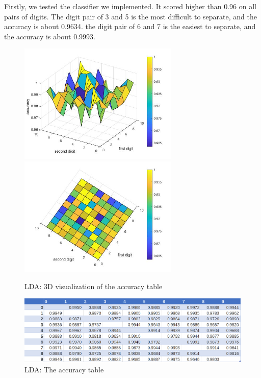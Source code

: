 \documentclass{article}
\begin{document}
Firstly, we tested the classifier we implemented. It scored higher than 0.96 on all pairs of digits. The digit pair of 3 and 5 is the most difficult to separate, and the accuracy is about 0.9634. the digit pair of 6 and 7 is the easiest to separate, and the accuracy is about 0.9993.\\
\begin{figure}[h]
    \centerline{\includegraphics[width=3in]{surf1.jpg}\includegraphics[width=3in]{surf2.jpg}}
    \caption{LDA: 3D visualization of the accuracy table}
\end{figure}
\begin{figure}[h]
    \centerline{\includegraphics[width=6in]{LDAtable.PNG}}
    \caption{LDA: The accuracy table}
\end{figure}
\end{document}
